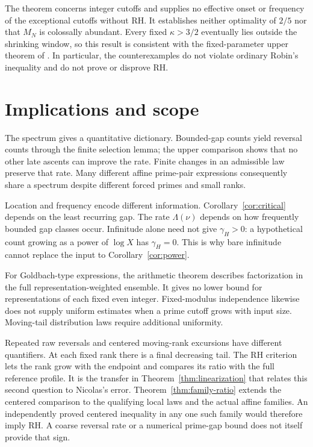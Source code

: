 \documentclass[11pt]{article}
\theoremstyle{definition}
\begin{document}
The theorem concerns integer cutoffs and supplies no effective onset
or frequency of the exceptional cutoffs without RH. It establishes
neither optimality of $2/5$ nor that $M_N$ is colossally abundant.
Every fixed $\kappa>3/2$ eventually lies outside the shrinking window,
so this result is consistent with the fixed-parameter upper theorem
of \cite{FKM}. In particular, the counterexamples do not violate
ordinary Robin's inequality and do not prove or disprove RH.

\section{Implications and scope}\label{sec:implications}
The spectrum gives a quantitative dictionary. Bounded-gap counts
yield reversal counts through the finite selection lemma; the
upper comparison shows that no other late ascents can improve
the rate. Finite changes in an admissible law preserve that rate.
Many different affine prime-pair expressions consequently share
a spectrum despite different forced primes and small ranks.

Location and frequency encode different information.
Corollary~\ref{cor:critical} depends on the least recurring gap.
The rate $\Lambda(\nu)$ depends on how frequently bounded gap
classes occur. Infinitude alone need not give $\gamma_H>0$:
a hypothetical count growing as a power of $\log X$ has
$\gamma_H=0$. This is why bare infinitude cannot replace
the input to Corollary~\ref{cor:power}.

For Goldbach-type expressions, the arithmetic theorem describes
factorization in the full representation-weighted ensemble.
It gives no lower bound for representations of each fixed even
integer. Fixed-modulus independence likewise does not supply
uniform estimates when a prime cutoff grows with input size.
Moving-tail distribution laws require additional uniformity.

Repeated raw reversals and centered moving-rank excursions have
different quantifiers. At each fixed rank there is a final decreasing
tail. The RH criterion lets the rank grow with the endpoint and
compares its ratio with the full reference profile.
It is the transfer in Theorem~\ref{thm:linearization} that relates
this second question to Nicolas's error. Theorem~\ref{thm:family-ratio}
extends the centered comparison to the qualifying local laws and the
actual affine families. An independently proved centered inequality
in any one such family would therefore imply RH. A coarse reversal
rate or a numerical prime-gap bound does not itself provide that sign.
\end{document}
